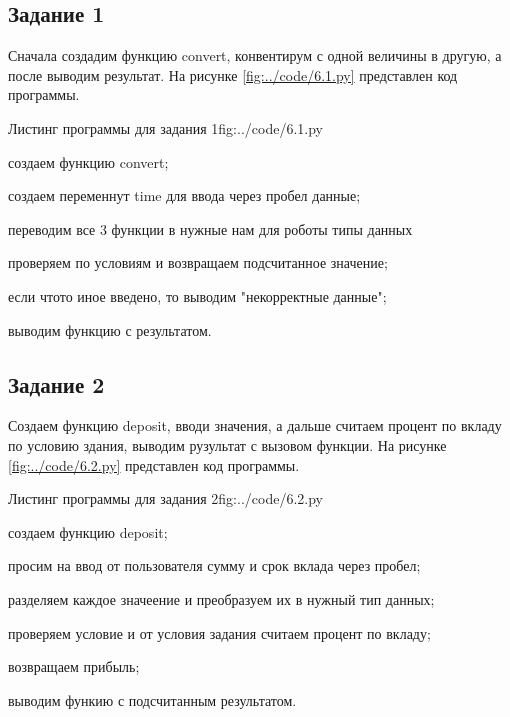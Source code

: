 \documentclass{vvsu}
\begin{document}
\subsection{Задание 1}
  Сначала создадим функцию convert, конвентирум с одной величины в другую, а после выводим результат. На рисунке \ref{fig:../code/6.1.py} представлен код программы.

\begin{vvsu_figure}{Листинг программы для задания 1}{fig:../code/6.1.py}
  \begin{minipage}{.75\textwidth}
    
  \end{minipage}
\end{vvsu_figure}

\begin{vvsu_list}
  \item создаем функцию convert;
  \item создаем переменнут time для ввода через пробел данные;
  \item переводим все 3 функции в нужные нам для роботы типы данных
  \item проверяем по условиям и возвращаем подсчитанное значение;
  \item если чтото иное введено, то выводим "некорректные данные";
  \item выводим функцию с результатом.
\end{vvsu_list}

\subsection{Задание 2}
 Создаем функцию deposit, вводи значения, а дальше считаем процент по вкладу по условию здания, выводим рузультат с вызовом функции. На рисунке  \ref{fig:../code/6.2.py} представлен код программы.

\begin{vvsu_figure}{Листинг программы для задания 2}{fig:../code/6.2.py}
  \begin{minipage}{.75\textwidth}
    
  \end{minipage}
\end{vvsu_figure}

\begin{vvsu_list}
  \item создаем функцию deposit;
  \item просим на ввод от пользователя сумму и срок вклада через пробел;
  \item разделяем каждое значеение и преобразуем их в нужный тип данных;
  \item проверяем условие и от условия задания считаем процент по вкладу;
  \item возвращаем прибыль;
  \item выводим функию с подсчитанным результатом.
\end{vvsu_list}
\end{document}
